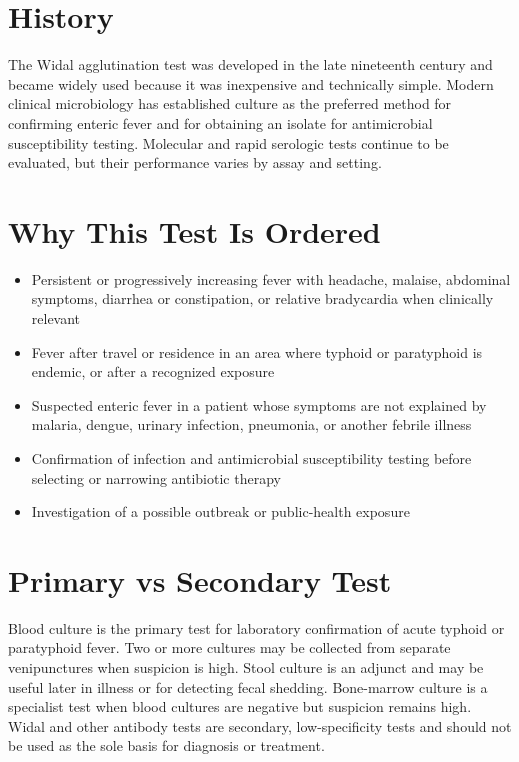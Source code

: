 \section*{History}
The Widal agglutination test was developed in the late nineteenth century and became widely used because it was inexpensive and technically simple. Modern clinical microbiology has established culture as the preferred method for confirming enteric fever and for obtaining an isolate for antimicrobial susceptibility testing. Molecular and rapid serologic tests continue to be evaluated, but their performance varies by assay and setting.

\section*{Why This Test Is Ordered}
\begin{itemize}
  \item Persistent or progressively increasing fever with headache, malaise, abdominal symptoms, diarrhea or constipation, or relative bradycardia when clinically relevant
  \item Fever after travel or residence in an area where typhoid or paratyphoid is endemic, or after a recognized exposure
  \item Suspected enteric fever in a patient whose symptoms are not explained by malaria, dengue, urinary infection, pneumonia, or another febrile illness
  \item Confirmation of infection and antimicrobial susceptibility testing before selecting or narrowing antibiotic therapy
  \item Investigation of a possible outbreak or public-health exposure
\end{itemize}

\section*{Primary vs Secondary Test}
Blood culture is the primary test for laboratory confirmation of acute typhoid or paratyphoid fever. Two or more cultures may be collected from separate venipunctures when suspicion is high. Stool culture is an adjunct and may be useful later in illness or for detecting fecal shedding. Bone-marrow culture is a specialist test when blood cultures are negative but suspicion remains high. Widal and other antibody tests are secondary, low-specificity tests and should not be used as the sole basis for diagnosis or treatment.

